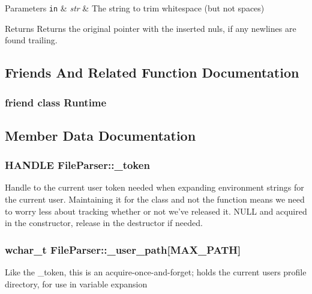 \begin{DoxyParams}[1]{Parameters}
\mbox{\tt in}  & {\em str} & The string to trim whitespace (but not spaces) \\
\hline
\end{DoxyParams}
\begin{DoxyReturn}{Returns}
Returns the original pointer with the inserted nuls, if any newlines are found trailing. 
\end{DoxyReturn}


\subsection{Friends And Related Function Documentation}
\subsubsection[{Runtime}]{\setlength{\rightskip}{0pt plus 5cm}friend class {\bf Runtime}\hspace{0.3cm}{\ttfamily [friend]}}\label{class_file_parser_af3d14e26ba8af9e6cc5a32aad8446de7}


\subsection{Member Data Documentation}
\subsubsection[{\-\_\-token}]{\setlength{\rightskip}{0pt plus 5cm}H\-A\-N\-D\-L\-E File\-Parser\-::\-\_\-token\hspace{0.3cm}{\ttfamily [private]}}\label{class_file_parser_abb6d21bebba226019e13530b08a57137}
Handle to the current user token needed when expanding environment strings for the current user. Maintaining it for the class and not the function means we need to worry less about tracking whether or not we've released it. N\-U\-L\-L and acquired in the constructor, release in the destructor if needed. 
\subsubsection[{\-\_\-user\-\_\-path}]{\setlength{\rightskip}{0pt plus 5cm}wchar\-\_\-t File\-Parser\-::\-\_\-user\-\_\-path\mbox{[}M\-A\-X\-\_\-\-P\-A\-T\-H\mbox{]}\hspace{0.3cm}{\ttfamily [private]}}\label{class_file_parser_aaf1c4178ca8624865e2640da03b05c53}
Like the \-\_\-token, this is an acquire-\/once-\/and-\/forget; holds the current users profile directory, for use in variable expansion 

